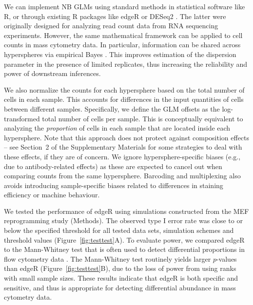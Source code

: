 \documentclass{article}
\newcommand{\suppcomponorm}{2}
\begin{document}
We can implement NB GLMs using standard methods in statistical software like R, or through existing R packages like edgeR \cite{robinson2010edgeR} or DESeq2 \cite{love2014moderated}.
The latter were originally designed for analyzing read count data from RNA sequencing experiments.
However, the same mathematical framework can be applied to cell counts in mass cytometry data.
In particular, information can be shared across hyperspheres via empirical Bayes \cite{mccarthy2012differential, lund2012detecting}.
This improves estimation of the dispersion parameter in the presence of limited replicates, thus increasing the reliability and power of downstream inferences.

We also normalize the counts for each hypersphere based on the total number of cells in each sample.
This accounts for differences in the input quantities of cells between different samples.
Specifically, we define the GLM offsets as the log-transformed total number of cells per sample.
This is conceptually equivalent to analyzing the \textit{proportion} of cells in each sample that are located inside each hypersphere.
Note that this approach does not protect against composition effects -- see Section~\suppcomponorm{} of the Supplementary Materials for some strategies to deal with these effects, if they are of concern.
We ignore hypersphere-specific biases (e.g., due to antibody-related effects) as these are expected to cancel out when comparing counts from the same hypersphere.
Barcoding and multiplexing also avoids introducing sample-specific biases related to differences in staining efficiency or machine behaviour.

We tested the performance of edgeR using simulations constructed from the MEF reprogramming study (Methods).
The observed type I error rate was close to or below the specified threshold for all tested data sets, simulation schemes and threshold values (Figure~\ref{fig:testtest}A).
To evaluate power, we compared edgeR to the Mann-Whitney test that is often used to detect differential proportions in flow cytometry data \cite{watson1992significance}.
The Mann-Whitney test routinely yields larger $p$-values than edgeR (Figure~\ref{fig:testtest}B), due to the loss of power from using ranks with small sample sizes.
These results indicate that edgeR is both specific and sensitive, and thus is appropriate for detecting differential abundance in mass cytometry data.
\end{document}
